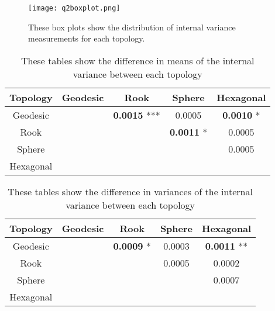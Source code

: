 \begin{figure}[hbt]
\centering
\texttt{[image: q2boxplot.png]}
\caption{These box plots show the distribution of internal variance measurements
for each topology.}
\label{q2boxplot}
\end{figure}


\begin{table}[hbt]
  \centering
  \caption{These tables show the difference in means of the internal variance between each topology}
  \label{rlt:all}
  \begin{tabular}{|c||c|c|c|c|}
  \hline
  \textbf{Topology}&Geodesic &Rook	&Sphere			&Hexagonal		\\\hline
  \hline
  Geodesic	&& \textbf{0.0015} ***	& 0.0005		& \textbf{0.0010} *	\\\hline
  Rook		&& 			& \textbf{0.0011} *	& 0.0005		\\\hline
  Sphere	&& 			& 			& 0.0005 		\\\hline
  Hexagonal 	&& 			& 			&			\\\hline
  \end{tabular}
  \end{table}




\begin{table}[hbt]
  \centering
  \caption{These tables show the difference in variances of the internal variance between each topology}
  \label{rlt:allV}
  \begin{tabular}{|c||c|c|c|c|}
  \hline
  \textbf{Topology}&Geodesic &Rook	&Sphere			&Hexagonal		\\\hline
  \hline
  Geodesic	&& \textbf{0.0009} *	& 0.0003		& \textbf{0.0011} **	\\\hline
  Rook		&& 			& 0.0005		& 0.0002		\\\hline
  Sphere	&& 			& 			& 0.0007 		\\\hline
  Hexagonal 	&& 			& 			&			\\\hline
  \end{tabular}
  \end{table}



